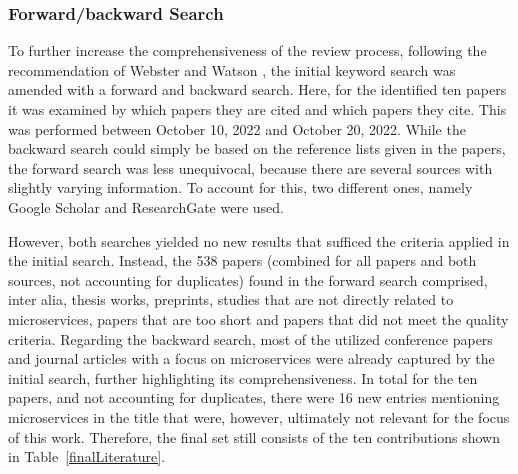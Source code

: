 \documentclass{bmcart}
\begin{document}
\subsubsection{Forward/backward Search}

To further increase the comprehensiveness of the review process, following the recommendation of Webster and Watson \cite{webster2002analyzing}, the initial keyword search was amended with a forward and backward search. Here, for the identified ten papers it was examined by which papers they are cited and which papers they cite. This was performed between October 10, 2022 and October 20, 2022. While the backward search could simply be based on the reference lists given in the papers, the forward search was less unequivocal, because there are several sources with slightly varying information. To account for this, two different ones, namely Google Scholar and ResearchGate were used. 

However, both searches yielded no new results that sufficed the criteria applied in the initial search. 
Instead, the 538 papers (combined for all papers and both sources, not accounting for duplicates) found in the forward search comprised, inter alia, thesis works, preprints, studies that are not directly related to microservices, papers that are too short and papers that did not meet the quality criteria. Regarding the backward search, most of the utilized conference papers and journal articles with a focus on microservices were already captured by the initial search, further highlighting its comprehensiveness. In total for the ten papers, and not accounting for duplicates, there were 16 new entries mentioning microservices in the title that were, however, ultimately not relevant for the focus of this work. Therefore, the final set still consists of the ten contributions shown in Table~\ref{finalLiterature}.
\end{document}
